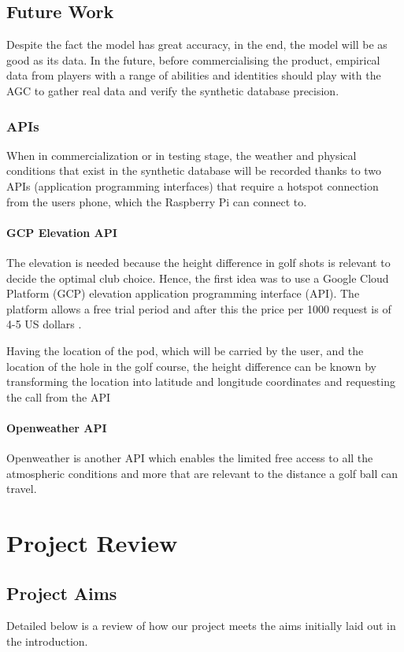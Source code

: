 \documentclass[11pt,landscape]{article}
\begin{document}
\newpage
\begin{multicols}{3}
\subsection{Future Work}
Despite the fact the model has great accuracy, in the end, the model will be as
good as its data. In the future, before commercialising the product, empirical
data from players with a range of abilities and identities should play with the
AGC to gather real data and verify the synthetic database precision.

\subsubsection{APIs}
When in commercialization or in testing stage, the weather and physical
conditions that exist in the synthetic database will be recorded thanks to two
APIs (application programming interfaces) that require a hotspot connection from
the users phone, which the Raspberry Pi can connect to.

\paragraph{GCP Elevation API} 
The elevation is needed because the height difference in golf shots is relevant
to decide the optimal club choice. Hence, the first idea was to use a Google
Cloud Platform (GCP) elevation application programming interface (API). The
platform allows a free trial period and after this the price per 1000 request is
of 4-5 US dollars \cite{google_docs}. 

Having the location of the pod, which will be carried by the user, and the
location of the hole in the golf course, the height difference can be known by
transforming the location into latitude and longitude coordinates and requesting
the call from the API

\paragraph{Openweather API}
Openweather is another API which enables the limited free access to all the
atmospheric conditions and more that are relevant to the distance a golf ball
can travel.

\section{Project Review}
\subsection{Project Aims}
Detailed below is a review of how our project meets the aims initially laid out
in the introduction.

\end{multicols}
\end{document}
